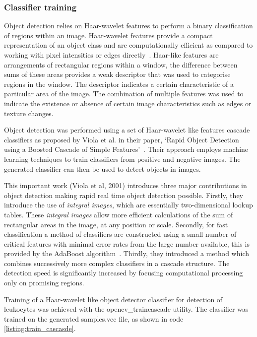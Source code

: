 \subsubsection{Classifier training}
Object detection relies on Haar-wavelet features to perform a binary classification of regions within an image. Haar-wavelet features provide a compact representation of an object class and are computationally efficient as compared to working with pixel intensities or edges directly~\cite{Papageorgiou1998}. Haar-like features are arrangements of rectangular regions within a window, the difference between sums of these areas provides a weak descriptor that was used to categorise regions in the window. The descriptor indicates a certain characteristic of a particular area of the image. The combination of multiple features was used to indicate the existence or absence of certain image characteristics such as edges or texture changes.

Object detection was performed using a set of Haar-wavelet like features cascade classifiers as proposed by Viola et al. in their paper, `Rapid Object Detection using a Boosted Cascade of Simple Features'~\cite{Viola2001}. Their approach employs machine learning techniques to train classifiers from positive and negative images. The generated classifier can then be used to detect objects in images.

This important work (Viola et al, 2001) introduces three major contributions in object detection making rapid real time object detection possible. Firstly, they introduce the use of \emph{integral images}, which are essentially two-dimensional lookup tables. These \emph{integral images} allow more efficient calculations of the sum of rectangular areas in the image, at any position or scale. Secondly, for fast classification a method of classifiers are constructed using a small number of critical features with minimal error rates from the large number available, this is provided by the AdaBoost algorithm~\cite{Friedman2000}. Thirdly, they introduced a method which combines successively more complex classifiers in a cascade structure. The detection speed is significantly increased by focusing computational processing only on promising regions.

Training of a Haar-wavelet like object detector classifier for detection of leukocytes was achieved with the opencv\_traincascade utility. The classifier was trained on the generated samples.vec file, as shown in code \autoref{listing:train_cascasde}.

